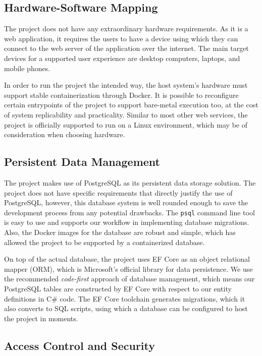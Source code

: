 \documentclass[a4paper, 12pt, titlepage]{article}
\begin{document}
  \subsection{Hardware-Software Mapping}

  The project does not have any extraordinary hardware requirements.
  As it is a web application, it requires the users to have a device using which they can
  connect to the web server of the application over the internet.
  The main target devices for a supported user experience are desktop computers, laptops, and mobile phones.

  In order to run the project the intended way, the host system's hardware must support stable containerization through Docker.
  It is possible to reconfigure certain entrypoints of the project to support bare-metal execution too, at the cost of
  system replicability and practicality.
  Similar to most other web services, the project is officially supported to run on a Linux environment, which
  may be of consideration when choosing hardware.

  \subsection{Persistent Data Management}

  The project makes use of PostgreSQL as its persistent data storage solution.
  The project does not have specific requirements that directly justify the use of PostgreSQL,
  however, this database system is well rounded enough to save the development process from any potential drawbacks.
  The \texttt{psql} command line tool is easy to use and supports our workflow in implementing database migrations.
  Also, the Docker images for the database are robust and simple,
  which has allowed the project to be supported by a containerized database.

  On top of the actual database, the project uses EF Core as an object relational mapper (ORM),
  which is Microsoft's official library for data persistence.
  We use the recommended \textit{code-first} approach of database management, which means our PostgreSQL tables are
  constructed by EF Core with respect to our entity definitions in C\# code.
  The EF Core toolchain generates migrations, which it also converts to SQL scripts,
  using which a database can be configured to host the project in moments.

  \subsection{Access Control and Security}
\end{document}
